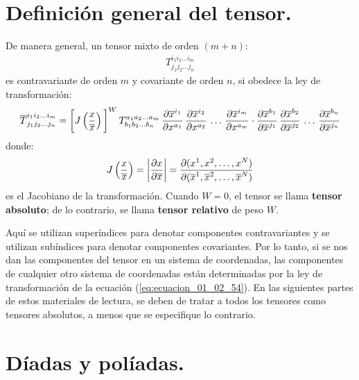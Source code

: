 \documentclass[hidelinks,12pt]{article}
\begin{document}
\section{Definición general del tensor.}

De manera general, un tensor mixto de orden $(m + n)$:
\begin{align}
T_{j_{1} j_{2} \ldots j_{n}}^{i_{1} i_{2} \ldots i_{m}}
\label{eq:ecuacion_01_02_53}
\end{align}
es contravariante de orden $m$ y covariante de orden $n$, si obedece la ley de transformación:
\begin{align}
\overline{T}_{j_{1} j_{2} \ldots j_{n}}^{i_{1} i_{2} \ldots i_{m}} = \bigg[ J \left( \dfrac{x}{\overline{x}} \right) \bigg]^{W} \, T_{b_{1} b_{2} \ldots b_{n}}^{a_{1} a_{2} \ldots a_{m}} \, \pdv{\overline{x}^{i_{1}}}{x^{a_{1}}} \, \pdv{\overline{x}^{i_{2}}}{x^{a_{2}}} \, \ldots \, \pdv{\overline{x}^{i_{m}}}{x^{a_{m}}} \cdot \pdv{\overline{x}^{b_{1}}}{\overline{x}^{j_{1}}} \, \pdv{\overline{x}^{b_{2}}}{\overline{x}^{j_{2}}} \, \ldots \, \pdv{\overline{x}^{b_{n}}}{\overline{x}^{j_{n}}}
\label{eq:ecuacion_01_02_54}
\end{align}
donde:
\begin{align*}
J \left( \dfrac{x}{\overline{x}} \right) = \abs{\pdv{x}{\overline{x}}} = \pdv{(x^{1}, x^{2}, \ldots, x^{N})}{(\overline{x}^{1}, \overline{x}^{2}, \ldots, \overline{x}^{N})}
\end{align*}
es el Jacobiano de la transformación. Cuando $W = 0$, el tensor se llama \textbf{tensor absoluto}; de lo contrario, se llama \textbf{tensor relativo} de peso $W$.
\par
Aquí se utilizan superíndices para denotar componentes contravariantes y se utilizan subíndices para denotar componentes covariantes. Por lo tanto, si se nos dan las componentes del tensor en un sistema de coordenadas, las componentes de cualquier otro sistema de coordenadas están determinadas por la ley de transformación de la ecuación (\ref{eq:ecuacion_01_02_54}). En las siguientes partes de estos materiales de lectura, se deben de tratar a todos los tensores como tensores absolutos, a menos que se especifique lo contrario.

\section{Díadas y políadas.}
\end{document}
